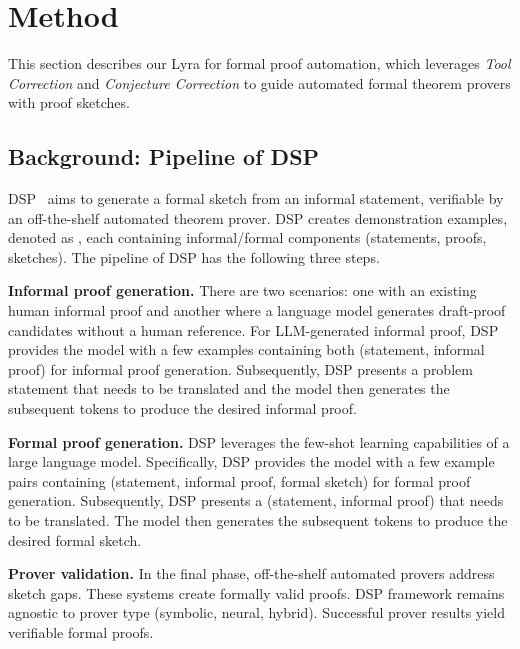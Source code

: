 \documentclass{article} \usepackage{iclr2024_conference,times}
\def\methodOneFull{\textit{Tool Correction}\xspace}
\def\methodTwoFull{\textit{Conjecture Correction}\xspace}
\def\fullname{Lyra\xspace}
\begin{document}
\section{Method}
This section describes our \fullname for formal proof automation, which leverages \methodOneFull and \methodTwoFull to guide automated formal theorem provers with proof sketches. 

\subsection{Background: Pipeline of DSP}
 DSP~\citep{jiang2023draft} aims to generate a formal sketch from an informal statement, verifiable by an off-the-shelf automated theorem prover. DSP creates  demonstration examples, denoted as , each containing informal/formal components (statements, proofs, sketches). The pipeline of DSP has the following three steps.

\textbf{Informal proof generation.} There are two scenarios: one with an existing human informal proof and another where a language model generates draft-proof candidates without a human reference. For LLM-generated informal proof, DSP provides the model with a few examples containing both (statement, informal proof) for informal proof generation. Subsequently, DSP presents a problem statement that needs to be translated and the model then generates the subsequent tokens to produce the desired informal proof.

\textbf{Formal proof generation.} DSP leverages the few-shot learning capabilities of a large language model. Specifically, DSP provides the model with a few example pairs containing (statement, informal proof, formal sketch) for formal proof generation. Subsequently, DSP presents a (statement, informal proof) that needs to be translated. The model then generates the subsequent tokens to produce the desired formal sketch.

\textbf{Prover validation.} In the final phase, off-the-shelf automated provers address sketch gaps. These systems create formally valid proofs. DSP framework remains agnostic to prover type (symbolic, neural, hybrid). Successful prover results yield verifiable formal proofs.
\end{document}
